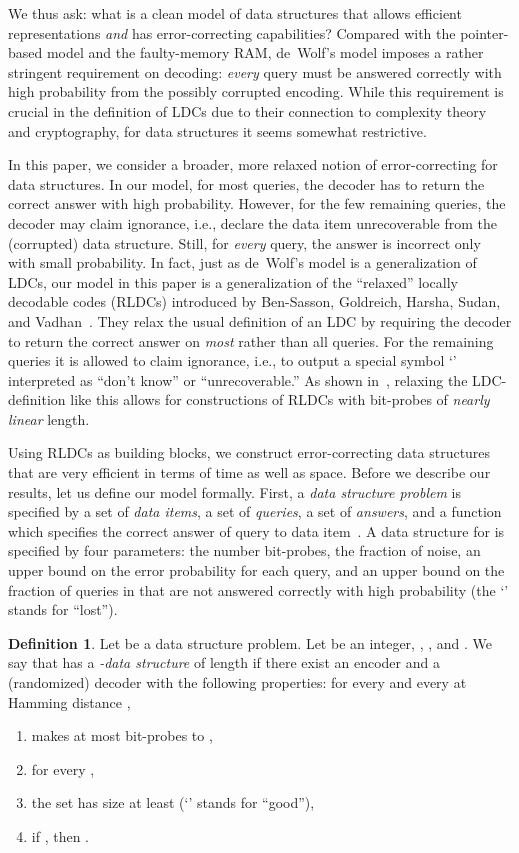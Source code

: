 \documentclass[11pt,english]{article}
\theoremstyle{definition}
\newtheorem{defn}{Definition}
\theoremstyle{remark}
\begin{document}
We thus ask: what is a clean model of data structures that allows
efficient representations \emph{and} has error-correcting capabilities?
Compared with the pointer-based model and the faulty-memory RAM, de~Wolf's
model imposes a rather stringent requirement on decoding: \emph{every}
query must be answered correctly with high probability from the possibly corrupted
encoding. While this requirement is crucial in the definition of LDCs
due to their connection to complexity theory and cryptography, for
data structures it seems somewhat restrictive.

In this paper, we consider a broader, more relaxed notion of error-correcting for data structures. 
In our model, for most queries, the decoder has to return the correct answer with
high probability.  However, for the few remaining queries, the decoder may claim ignorance, 
i.e., declare the data item unrecoverable from the (corrupted) data structure. 
Still, for \emph{every} query, the answer is incorrect only with small probability.
In fact, just as de~Wolf's model is a generalization of LDCs, our model in this paper
is a generalization of the ``relaxed'' locally decodable codes (RLDCs) introduced
by Ben-Sasson, Goldreich, Harsha, Sudan, and Vadhan~\cite{bghsv04}.
They relax the usual definition of an LDC by requiring the decoder
to return the correct answer on \emph{most} rather than all queries.
For the remaining queries it is allowed to claim ignorance, i.e.,
to output a special symbol `' interpreted as ``don't know''
or ``unrecoverable.'' As shown in~\cite{bghsv04}, relaxing the
LDC-definition like this allows for constructions of RLDCs
with  bit-probes of \emph{nearly linear} length. 

Using RLDCs as building blocks, we construct error-correcting data structures that are very efficient in terms of time
as well as space. Before we describe our results, let us define
our model formally. First, a \emph{data structure problem} is specified
by a set  of \emph{data items}, a set  of \emph{queries},
a set  of \emph{answers}, and a function 
which specifies the correct answer  of query  to data
item~. A data structure for  is specified by four parameters:
 the number bit-probes,  the fraction of noise,  an upper
bound on the error probability for each query, and  an upper bound on
the fraction of queries in  that are not answered correctly with high probability 
(the `' stands for ``lost'').

\begin{defn}\label{def:data structure}Let 
be a data structure problem. Let  be an integer, 
, , and . We
say that  has a \emph{-data structure}
of length  if there exist an encoder  and a
(randomized) decoder  with the following properties: for every  and every  at Hamming distance , 
\begin{enumerate}
\item  makes at most  bit-probes to , 
\item  for every , 
\item the set  has size at least
 (`' stands for ``good''),
\item if , then . 
\end{enumerate}
\end{defn}
\end{document}
